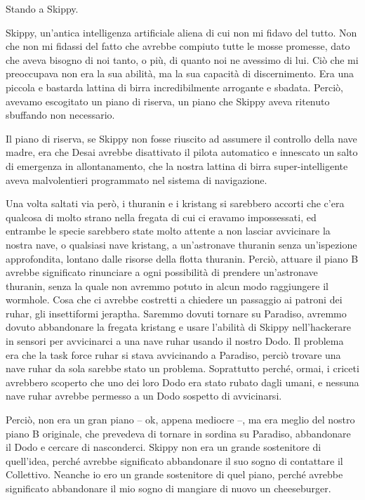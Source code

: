 Stando a Skippy.

Skippy, un'antica intelligenza artificiale aliena di cui non mi fidavo
del tutto. Non che non mi fidassi del fatto che avrebbe compiuto tutte
le mosse promesse, dato che aveva bisogno di noi tanto, o più, di quanto
noi ne avessimo di lui. Ciò che mi preoccupava non era la sua abilità,
ma la sua capacità di discernimento. Era una piccola e bastarda lattina
di birra incredibilmente arrogante e sbadata. Perciò, avevamo escogitato
un piano di riserva, un piano che Skippy aveva ritenuto sbuffando non
necessario.

Il piano di riserva, se Skippy non fosse riuscito ad assumere il
controllo della nave madre, era che Desai avrebbe disattivato il pilota
automatico e innescato un salto di emergenza in allontanamento, che la
nostra lattina di birra super-intelligente aveva malvolentieri
programmato nel sistema di navigazione.

Una volta saltati via però, i thuranin e i kristang si sarebbero accorti
che c'era qualcosa di molto strano nella fregata di cui ci eravamo
impossessati, ed entrambe le specie sarebbero state molto attente a non
lasciar avvicinare la nostra nave, o qualsiasi nave kristang, a
un'astronave thuranin senza un'ispezione approfondita, lontano dalle
risorse della flotta thuranin. Perciò, attuare il piano B avrebbe
significato rinunciare a ogni possibilità di prendere un'astronave
thuranin, senza la quale non avremmo potuto in alcun modo raggiungere il
wormhole. Cosa che ci avrebbe costretti a chiedere un passaggio ai
patroni dei ruhar, gli insettiformi jeraptha. Saremmo dovuti tornare su
Paradiso, avremmo dovuto abbandonare la fregata kristang e usare
l'abilità di Skippy nell'hackerare in sensori per avvicinarci a una nave
ruhar usando il nostro Dodo. Il problema era che la task force ruhar si
stava avvicinando a Paradiso, perciò trovare una nave ruhar da sola
sarebbe stato un problema. Soprattutto perché, ormai, i criceti
avrebbero scoperto che uno dei loro Dodo era stato rubato dagli umani, e
nessuna nave ruhar avrebbe permesso a un Dodo sospetto di avvicinarsi.

Perciò, non era un gran piano -- ok, appena mediocre --, ma era meglio
del nostro piano B originale, che prevedeva di tornare in sordina su
Paradiso, abbandonare il Dodo e cercare di nasconderci. Skippy non era
un grande sostenitore di quell'idea, perché avrebbe significato
abbandonare il suo sogno di contattare il Collettivo. Neanche io ero un
grande sostenitore di quel piano, perché avrebbe significato abbandonare
il mio sogno di mangiare di nuovo un cheeseburger.

